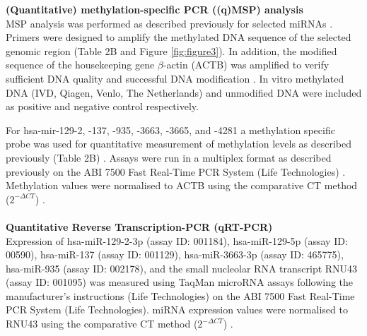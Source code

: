 \textbf{(Quantitative) methylation-specific PCR ((q)MSP) analysis}
\\
MSP analysis was performed as described previously for selected miRNAs \cite{Overmeer2009}. Primers were designed to amplify the methylated DNA sequence of the selected genomic region (Table 2B and Figure \ref{fig:figure3}). In addition, the modified sequence of the housekeeping gene $\beta$-actin (ACTB) was amplified to verify sufficient DNA quality and successful DNA modification \cite{Harden2003}. In vitro methylated DNA (IVD, Qiagen, Venlo, The Netherlands) and unmodified DNA were included as positive and negative control respectively.

For hsa-mir-129-2, -137, -935, -3663, -3665, and -4281 a methylation specific probe was used for quantitative measurement of methylation levels as described previously (Table 2B) \cite{Wilting2010}. Assays were run in a multiplex format as described previously on the ABI 7500 Fast Real-Time PCR System (Life Technologies) \cite{Snellenberg2012}. Methylation values were normalised to ACTB using the comparative CT method ($2^{-\Delta CT}$) \cite{Schmittgen2008}.
\\
\\
\textbf{Quantitative Reverse Transcription-PCR (qRT-PCR)}
\\ 
Expression of hsa-miR-129-2-3p (assay ID: 001184), hsa-miR-129-5p (assay ID: 00590), hsa-miR-137 (assay ID: 001129), hsa-miR-3663-3p (assay ID: 465775), hsa-miR-935 (assay ID: 002178), and  the small nucleolar RNA transcript RNU43 (assay ID: 001095) was measured using TaqMan microRNA assays following the manufacturer’s instructions (Life Technologies) on the ABI 7500 Fast Real-Time PCR System (Life Technologies). miRNA expression values were normalised to RNU43 using the comparative CT method ($2^{-\Delta CT}$)  \cite{Schmittgen2008}.

